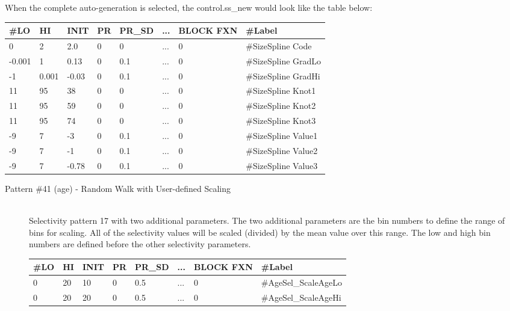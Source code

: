 \begin{description}
	When the complete auto-generation is selected, the control.ss\_new would look like the table below:
	
	\begin{center}
		\begin{longtable}{p{0.8cm} p{0.8cm} p{1cm} p{0.8cm} p{1.75cm}p{1cm} p{1.2cm} p{5.2cm}}
			\hline
			\#LO & HI & INIT & PR & PR\_SD & ... & BLOCK FXN & \#Label \\
			\hline
			0      &     2 &   2.0 & 0 & 0   & ... & 0 & \#SizeSpline Code\\
			-0.001 & 	 1 &  0.13 & 0 & 0.1 & ... & 0 & \#SizeSpline GradLo\\
			-1     & 0.001 & -0.03 & 0 & 0.1 & ... & 0 & \#SizeSpline GradHi\\
			11     & 	95 & 	38 & 0 & 0   & ... & 0 & \#SizeSpline Knot1\\
			11     & 	95 & 	59 & 0 & 0   & ... & 0 & \#SizeSpline Knot2\\
			11     & 	95 & 	74 & 0 & 0   & ... & 0 & \#SizeSpline Knot3\\
			-9     & 	 7 & 	-3 & 0 & 0.1 & ... & 0 & \#SizeSpline Value1\\
			-9     &   	 7 & 	-1 & 0 & 0.1 & ... & 0 & \#SizeSpline Value2\\
			-9     & 	 7 & -0.78 & 0 & 0.1 & ... & 0 & \#SizeSpline Value3\\
			\hline
		\end{longtable}
	\end{center}
\end{description}

\begin{description}
	\item[Pattern \#41 (age) - Random Walk with User-defined Scaling]\hfil\\
	Selectivity pattern 17 with two additional parameters. The two additional parameters are the bin numbers to define the range of bins for scaling. All of the selectivity values will be scaled (divided) by the mean value over this range. The low and high bin numbers are defined before the other selectivity parameters.

	\begin{center}
		\begin{longtable}{p{0.8cm} p{0.8cm} p{1cm} p{0.8cm} p{1.75cm}p{1cm} p{1.2cm} p{5.2cm}}
			\hline
			\#LO & HI & INIT & PR & PR\_SD & ... & BLOCK FXN & \#Label \\
			\hline
			0 & 20 & 10 & 0 & 0.5 & ... & 0 & \#AgeSel\_ScaleAgeLo \\
			0 & 20 & 20 & 0 & 0.5 & ... & 0 & \#AgeSel\_ScaleAgeHi \\
			\hline
		\end{longtable}
	\end{center}
\end{description}

